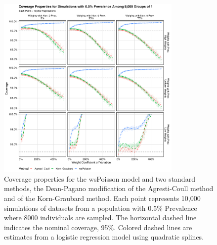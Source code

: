 \documentclass[AMA,STIX1COL]{WileyNJD-v2}
\begin{document}
\begin{figure}
\centering
\includegraphics[width=0.8\textwidth]{figures/perfect_coverage_8000_groups_0_005_prev.pdf}
\caption{Coverage properties for the wsPoisson model and two standard methods, the Dean-Pagano modification of the Agresti-Coull method and of the Korn-Graubard method.
Each point represents 10,000 simulations of datasets from a population with 0.5\% Prevalence where 8000 individuals are sampled.
The horizontal dashed line indicates the nominal coverage, 95\%.
Colored dashed lines are estimates from a logistic regression model using quadratic splines.}
\label{fig:perfect_coverage_8000_groups_0_005_prev}
\end{figure}
\end{document}
